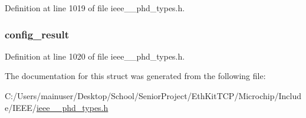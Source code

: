 Definition at line 1019 of file ieee\+\_\+\_\+phd\+\_\+types.\+h.

\hypertarget{struct___config_report_rsp_a47708ebf5413b500c2fcd606e170e2b9}{}
\subsubsection[{config\+\_\+result}]{ config\+\_\+result}\label{struct___config_report_rsp_a47708ebf5413b500c2fcd606e170e2b9}


Definition at line 1020 of file ieee\+\_\+\_\+phd\+\_\+types.\+h.



The documentation for this struct was generated from the following file\+:\begin{DoxyCompactItemize}
\item 
C\+:/\+Users/mainuser/\+Desktop/\+School/\+Senior\+Project/\+Eth\+Kit\+T\+C\+P/\+Microchip/\+Include/\+I\+E\+E\+E/\hyperlink{ieee__11073__phd__types_8h}{ieee\+\_\+\_\+phd\+\_\+types.\+h}\end{DoxyCompactItemize}
